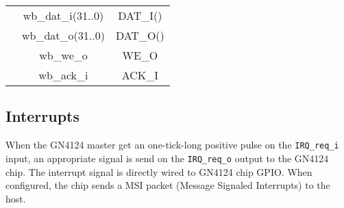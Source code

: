 \documentclass[10pt,a4paper]{cerndoc}
\begin{document}
\begin{tabularx}{\textwidth}{|X|cc|}
      &  wb\_dat\_i(31..0) &  DAT\_I()                                                                         \\
      &  wb\_dat\_o(31..0) &  DAT\_O()                                                                         \\
      &  wb\_we\_o         &  WE\_O                                                                            \\
      &  wb\_ack\_i        &  ACK\_I                                                                           \\ \hline
	\end{tabularx}

   \subsection{Interrupts}
   When the GN4124 master get an one-tick-long positive pulse on the \verb+IRQ_req_i+ input, an appropriate signal is send on the \verb+IRQ_req_o+ output to the GN4124 chip. The interrupt signal is directly wired to GN4124 chip GPIO. When configured, the chip sends a MSI packet (Message Signaled Interrupts) to the host.
\end{document}

